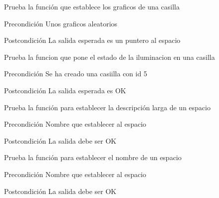\begin{DoxyRefList}
\item[\label{test__test000251}%
\hypertarget{test__test000251}{}%
Global \hyperlink{space__test_8c_af6840fd6655eb3d130b7f9315cee081a}{test1\-\_\-space\-\_\-set\-\_\-graphics} ()]Prueba la función que establece los graficos de una casilla \begin{DoxyPrecond}{Precondición}
Unos graficos aleatorios 
\end{DoxyPrecond}
\begin{DoxyPostcond}{Postcondición}
La salida esperada es un puntero al espacio  
\end{DoxyPostcond}

\item[\label{test__test000317}%
\hypertarget{test__test000317}{}%
Global \hyperlink{space__test_8c_a937753e5e6f5eb7b62425e98efae4acd}{test1\-\_\-space\-\_\-set\-\_\-iluminated} ()]Prueba la funcion que pone el estado de la iluminacion en una casilla \begin{DoxyPrecond}{Precondición}
Se ha creado una casiilla con id 5 
\end{DoxyPrecond}
\begin{DoxyPostcond}{Postcondición}
La salida esperada es O\-K  
\end{DoxyPostcond}

\item[\label{test__test000248}%
\hypertarget{test__test000248}{}%
Global \hyperlink{space__test_8c_a5eac430f7edc2c3c762186580bf2f7cb}{test1\-\_\-space\-\_\-set\-\_\-long\-\_\-description} ()]Prueba la función para establecer la descripción larga de un espacio \begin{DoxyPrecond}{Precondición}
Nombre que establecer al espacio 
\end{DoxyPrecond}
\begin{DoxyPostcond}{Postcondición}
La salida debe ser O\-K  
\end{DoxyPostcond}

\item[\label{test__test000242}%
\hypertarget{test__test000242}{}%
Global \hyperlink{space__test_8c_a2569bab6cfeec15f722d232bb8c78c9e}{test1\-\_\-space\-\_\-set\-\_\-name} ()]Prueba la función para establecer el nombre de un espacio \begin{DoxyPrecond}{Precondición}
Nombre que establecer al espacio 
\end{DoxyPrecond}
\begin{DoxyPostcond}{Postcondición}
La salida debe ser O\-K  
\end{DoxyPostcond}


\end{DoxyRefList}
